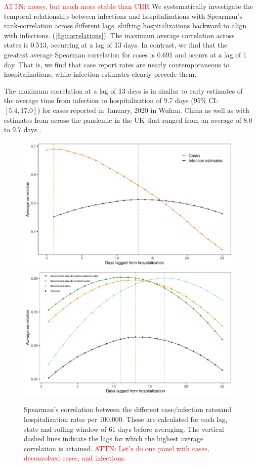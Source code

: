 \documentclass{article}
\newcommand{\attn }[1]{\textcolor{red}{ATTN: #1}}
\begin{document}
\attn{messy, but much more stable than CHR} We systematically investigate the
temporal relationship between infections and hospitalizations with Spearman's
rank-correlation across different lags, shifting hospitalizations backward to
align with infections. (\autoref{fig:correlations}). The maximum average
correlation across states is 0.513, occurring at a lag of 13 days. In contrast,
we find that the greatest average Spearman correlation for cases is 0.691 and
occurs at a lag of 1 day. That is, we find that case report rates are nearly
contemporaneous to hospitalizations, while infection estimates clearly precede
them. 

The maximum correlation at a lag of 13 days is in similar to early estimates of the average time from
infection to hospitalization of 9.7 days (95\% CI: $[5.4, 17.0]$) for cases
reported in January, 2020 in Wuhan, China as well as with estimates from across
the pandemic in the UK that ranged from an average of 8.0 to 9.7 days
\citep{ward2021understanding}. 

\begin{figure}[!tb]
\centering
\includegraphics[width=.45\textwidth]{infect_case_hosp_lag_corr_F24.pdf} 
\includegraphics[width=.45\textwidth]{adj_unadj_pi_no_inc_hosp_lag_corr_F24.pdf} 
\caption{Spearman's correlation between the different case/infection ratesand
hospitalization rates per 100,000. These are calculated for each
lag, state and rolling window of 61 days before averaging. 
The vertical dashed lines indicate the lags
for which the highest average correlation is attained. \attn{Let's do one panel
with cases, deconvolved cases, and infections.}}
\label{fig:correlations}
\end{figure}
    
\end{document}
